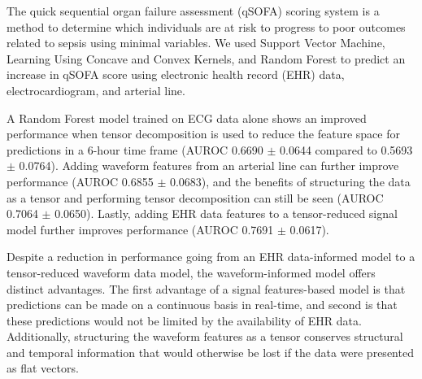 
The quick sequential organ failure assessment (qSOFA) scoring system is a method to determine which individuals are at risk to progress to poor outcomes related to sepsis using minimal variables. We used Support Vector Machine, Learning Using Concave and Convex Kernels, and Random Forest to predict an increase in qSOFA score using electronic health record (EHR) data, electrocardiogram, and arterial line.

A Random Forest model trained on ECG data alone shows an improved performance when tensor decomposition is used to reduce the feature space for predictions in a 6-hour time frame (AUROC 0.6690 $\pm$ 0.0644 compared to 0.5693 $\pm$ 0.0764). Adding waveform features from an arterial line can further improve performance (AUROC 0.6855 $\pm$ 0.0683), and the benefits of structuring the data as a tensor and performing tensor decomposition can still be seen (AUROC 0.7064 $\pm$ 0.0650). Lastly, adding EHR data features to a tensor-reduced signal model further improves performance (AUROC 0.7691 $\pm$ 0.0617).

Despite a reduction in performance going from an EHR data-informed model to a tensor-reduced waveform data model, the waveform-informed model offers distinct advantages. The first advantage of a signal features-based model is that predictions can be made on a continuous basis in real-time, and second is that these predictions would not be limited by the availability of EHR data. Additionally, structuring the waveform features as a tensor conserves structural and temporal information that would otherwise be lost if the data were presented as flat vectors.